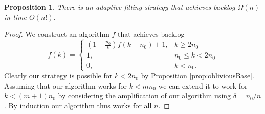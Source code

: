 \documentclass[twocolumn]{article}[10pt]
\newtheorem{proposition}{Proposition}
\begin{document}
\begin{proposition}
  \label{prop:factorialTimeAlg}
  There is an adaptive filling strategy that
  achieves backlog $\Omega(n)$ in time $O(n!)$.
\end{proposition}
\begin{proof}
  We construct an algorithm $f$ that achieves backlog 
  $$f(k) = \begin{cases}
    \left(1-\frac{n_0}{k}\right)f(k-n_0) + 1, &k \ge 2n_0\\
    1,  &n_0\le k < 2n_0 \\
    0, &k< n_0.
  \end{cases}$$
  Clearly our strategy is possible for $k<2n_0$ by Proposition \ref{prop:obliviousBase}.
  Assuming that our algorithm works for $k<mn_0$ we can extend it to work for
  $k<(m+1)n_0$ by considering the amplification of our algorithm using $\delta = n_0/n$.
  By induction our algorithm thus works for all $n$.


\end{proof}
\end{document}

